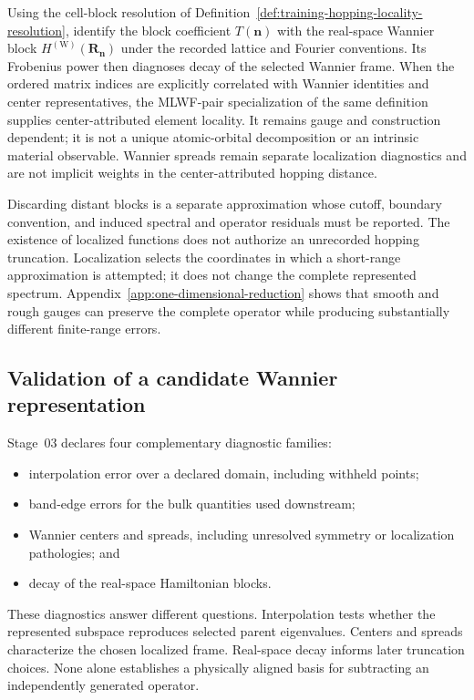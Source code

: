 Using the cell-block resolution of
Definition~\ref{def:training-hopping-locality-resolution}, identify the block
coefficient $T(\mathbf n)$ with the real-space Wannier block
$H^{(\mathrm W)}(\mathbf R_{\mathbf n})$ under the recorded lattice and Fourier
conventions. Its Frobenius power then diagnoses decay of the selected Wannier
frame. When the ordered matrix indices are explicitly correlated with Wannier
identities and center representatives, the MLWF-pair specialization of the
same definition supplies center-attributed element locality. It remains gauge
and construction dependent; it is not a unique atomic-orbital decomposition or
an intrinsic material observable. Wannier spreads remain separate localization
diagnostics and are not implicit weights in the center-attributed hopping
distance.

Discarding distant blocks is a separate approximation whose cutoff, boundary
convention, and induced spectral and operator residuals must be reported. The
existence of localized functions does not authorize an unrecorded hopping
truncation. Localization selects the coordinates in which a short-range
approximation is attempted; it does not change the complete represented
spectrum. Appendix~\ref{app:one-dimensional-reduction} shows that smooth and
rough gauges can preserve the complete operator while producing substantially
different finite-range errors.

\subsection{Validation of a candidate Wannier representation}


Stage~03 declares four complementary diagnostic families:

\begin{itemize}
  \item interpolation error over a declared domain, including withheld points;
  \item band-edge errors for the bulk quantities used downstream;
  \item Wannier centers and spreads, including unresolved symmetry or
    localization pathologies; and
  \item decay of the real-space Hamiltonian blocks.
\end{itemize}

These diagnostics answer different questions. Interpolation tests whether the
represented subspace reproduces selected parent eigenvalues. Centers and spreads
characterize the chosen localized frame. Real-space decay informs later
truncation choices. None alone establishes a physically aligned basis for
subtracting an independently generated operator.

